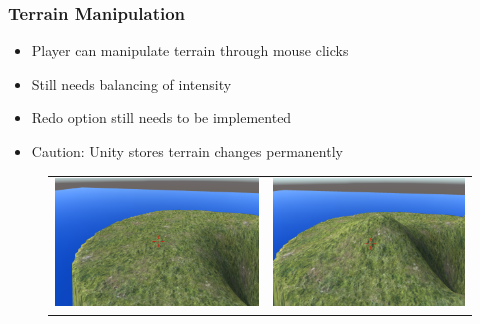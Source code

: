 \documentclass[xcolor=dvipsnames]{beamer}
\begin{document}
	\begin{frame}
		\frametitle{Terrain Manipulation}
		\begin{itemize}
			\item Player can manipulate terrain through mouse clicks
			\item Still needs balancing of intensity
			\item Redo option still needs to be implemented
			\item Caution: Unity stores terrain changes permanently
		\end{itemize}
			\begin{figure}[ht]
				\begin{tabular}{cc}
					\includegraphics[scale=0.3]{images/interim/terrainManipulation1}&
					\includegraphics[scale=0.3]{images/interim/terrainManipulation2}
				\end{tabular}
			\end{figure}
	\end{frame}
	
\end{document}
